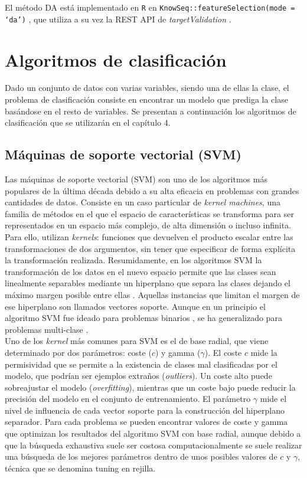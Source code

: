 El método DA  está implementado en \texttt{R}  en \texttt{KnowSeq::featureSelection(mode = `da')} \cite{KnowSeq}, que utiliza a su vez la REST API de \textit{targetValidation} \cite{OpenTargets2020}.

\section{Algoritmos de clasificación}

Dado un conjunto de datos con varias variables, siendo una de ellas la clase, el problema de clasificación consiste en encontrar un modelo que prediga la clase basándose en el resto de variables. Se presentan a continuación los  algoritmos de clasificación que se utilizarán en el capítulo 4.

\subsection{Máquinas de soporte vectorial (SVM)}

Las máquinas de soporte vectorial (SVM) son uno de los algoritmos más populares de la última década debido a su alta eficacia en problemas con grandes cantidades de datos. Consiste en un caso particular de \textit{kernel machines}, una familia de métodos en el que el espacio de características se transforma para ser representados en un espacio más complejo, de alta dimensión o incluso infinita. Para ello, utilizan \textit{kernels}: funciones que devuelven el producto escalar entre las transformaciones de dos argumentos, sin tener que especificar de forma explícita la transformación realizada. Resumidamente, en los algoritmos SVM la transformación de los datos en el nuevo espacio permite que las clases sean linealmente separables mediante un hiperplano que separa las clases dejando el máximo margen posible entre ellas \cite{Boser1992}. Aquellas instancias que limitan el margen de ese hiperplano son llamados vectores soporte. Aunque en un principio el algoritmo SVM fue ideado para problemas binarios \cite{Boser1992}, se ha generalizado para problemas multi-clase \cite{Duan2005}.\\

Uno de los \textit{kernel} más comunes para SVM es el de base radial, que viene determinado por dos parámetros: coste ($c$) y gamma ($\gamma$). El coste $c$ mide la permisividad que se permite a la existencia de clases mal clasificadas por el modelo, que podrían ser ejemplos extraños (\textit{outliers}). Un coste alto puede sobreajustar el modelo (\textit{overfitting}), mientras que un coste bajo puede reducir la precisión del modelo en el conjunto de entrenamiento. El parámetro $\gamma$ mide el nivel de influencia de cada vector soporte para la construcción del hiperplano separador. Para cada problema se pueden encontrar valores de coste y gamma que optimizan los resultados del algoritmo SVM con base radial, aunque debido a que la búsqueda exhaustiva suele ser costosa computacionalmente se suele realizar una búsqueda de los mejores parámetros dentro de unos posibles valores de $c$ y $\gamma$, técnica que se denomina tuning en rejilla.\\

